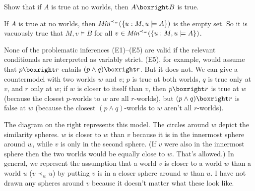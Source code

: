 \begin{exercise}
  Show that if $A$ is true at no worlds, then $A \boxright B$ is true.
\end{exercise}
\begin{solution}
  If $A$ is true at no worlds, then $\emph{Min}^{\prec_w}(\{u: M,u\models A\})$
  is the empty set. So it is vacuously true that $M,v \models B$ for all
  $v \in \emph{Min}^{\prec_w}(\{ u: M,u \models A \})$.
\end{solution}

None of the problematic inferences (E1)--(E5) are valid if the relevant
conditionals are interpreted as variably strict. (E5), for example, would assume
that $p \boxright r $ entails $(p \land q) \boxright r$. But it does not. We can
give a countermodel with two worlds $w$ and $v$; $p$ is true at both worlds, $q$
is true only at $v$, and $r$ only at $w$; if $w$ is closer to itself than $v$,
then $p \boxright r$ is true at $w$ (because the closest $p$-worlds to $w$ are
all $r$-worlds), but $(p \land q) \boxright r$ is false at $w$ (because the
closest $(p\land q)$-worlds to $w$ aren't all $r$-worlds).

\begin{wrapfigure}{r}{5cm}
  \quad
  \vspace{-10mm}
\end{wrapfigure}
The diagram on the right represents this model. The circles around $w$ depict
the similarity spheres. $w$ is closer to $w$ than $v$ because it is in the
innermost sphere around $w$, while $v$ is only in the second sphere. (If $v$
were also in the innermost sphere then the two worlds would be equally close to
$w$. That's allowed.) In general, we represent the assumption that a world $v$
is closer to a world $w$ than a world $u$ ($v \prec_w u$) by putting $v$ is in a
closer sphere around $w$ than $u$. I have not drawn any spheres around $v$
because it doesn't matter what these look like.


